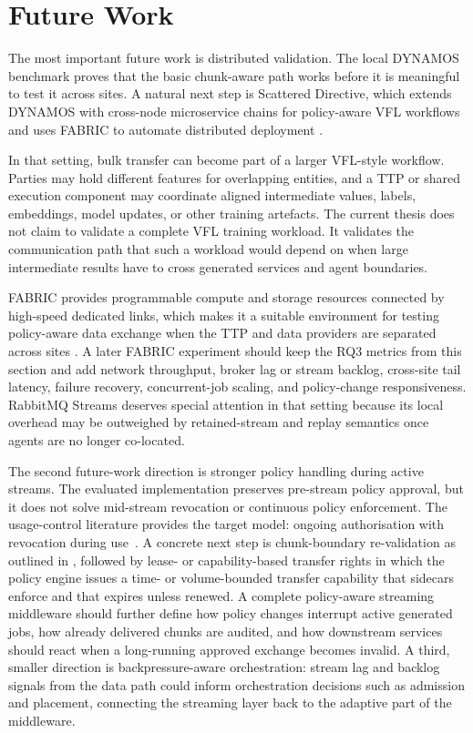 \section{Future Work}

The most important future work is distributed validation. The local DYNAMOS benchmark proves that the basic chunk-aware path works before it is meaningful to test it across sites. A natural next step is Scattered Directive, which extends DYNAMOS with cross-node microservice chains for policy-aware VFL workflows and uses FABRIC to automate distributed deployment \cite{jongejans2025scattered,scatteredDirectiveRepo2026}.

In that setting, bulk transfer can become part of a larger VFL-style workflow. Parties may hold different features for overlapping entities, and a TTP or shared execution component may coordinate aligned intermediate values, labels, embeddings, model updates, or other training artefacts. The current thesis does not claim to validate a complete VFL training workload. It validates the communication path that such a workload would depend on when large intermediate results have to cross generated services and agent boundaries.

FABRIC provides programmable compute and storage resources connected by high-speed dedicated links, which makes it a suitable environment for testing policy-aware data exchange when the TTP and data providers are separated across sites \cite{baldin2019fabric,fabricPortal2026}. A later FABRIC experiment should keep the RQ3 metrics from this section and add network throughput, broker lag or stream backlog, cross-site tail latency, failure recovery, concurrent-job scaling, and policy-change responsiveness. RabbitMQ Streams deserves special attention in that setting because its local overhead may be outweighed by retained-stream and replay semantics once agents are no longer co-located.

The second future-work direction is stronger policy handling during active streams. The evaluated implementation preserves pre-stream policy approval, but it does not solve mid-stream revocation or continuous policy enforcement. The usage-control literature provides the target model: ongoing authorisation with revocation during use~\cite{park2004ucon,hariri2023uconplus}. A concrete next step is chunk-boundary re-validation as outlined in , followed by lease- or capability-based transfer rights in which the policy engine issues a time- or volume-bounded transfer capability that sidecars enforce and that expires unless renewed. A complete policy-aware streaming middleware should further define how policy changes interrupt active generated jobs, how already delivered chunks are audited, and how downstream services should react when a long-running approved exchange becomes invalid. A third, smaller direction is backpressure-aware orchestration: stream lag and backlog signals from the data path could inform orchestration decisions such as admission and placement, connecting the streaming layer back to the adaptive part of the middleware.
